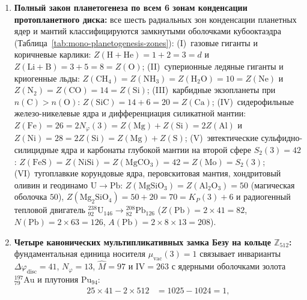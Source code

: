 \begin{theorem}[Периодическая система до 8-го периода, двухсферный перенос урана на остров стабильности $N=184$, закон планетогенеза по 6 зонам диска и четыре тождества Безу на $\mathbb{Z}_{512}$]
\begin{enumerate}[label=\textbf{(\arabic*)},leftmargin=*]
\begin{align}
    Z(\mathrm{Ti}_{22}) + Z(\mathrm{Cf}_{98}) &= Z(\mathrm{Cr}_{24}) + Z(\mathrm{Cm}_{96}) \;=\; Z(\mathrm{Fe}_{26}) + Z(\mathrm{Pu}_{94}) \;=\; 120, \label{eq:mono-hot-fusion-120} \\
    2\,N\bigl(^{238}_{92}\mathrm{U}_{146}\bigr) - 2\,\bigl(S_1(3) + S_2(3)\bigr) &= 292 - 108 \;=\; 184 \;=\; 2\,S_3(3) \;=\; N_{\mathrm{island}}(3). \label{eq:mono-uranium-transfer-184}
  \end{align}
\item \textbf{Полный закон планетогенеза по всем 6 зонам конденсации протопланетного диска:}
  все шесть радиальных зон конденсации планетных ядер и мантий классифицируются замкнутыми оболочками кубооктаэдра (Таблица~\ref{tab:mono-planetogenesis-zones}):
  (I)~газовые гиганты и коричневые карлики: $Z(\mathrm{H+He}) = 1 + 2 = 3 = d$ и $Z(\mathrm{Li+B}) = 3 + 5 = 8 = Z(\mathrm{O})$;
  (II)~суперионные ледяные гиганты и криогенные льды: $Z(\mathrm{CH_4}) = Z(\mathrm{NH_3}) = Z(\mathrm{H_2O}) = 10 = Z(\mathrm{Ne})$ и $Z(\mathrm{N_2}) = Z(\mathrm{CO}) = 14 = Z(\mathrm{Si})$;
  (III)~карбидные экзопланеты при $n(\mathrm{C}) > n(\mathrm{O})$: $Z(\mathrm{SiC}) = 14 + 6 = 20 = Z(\mathrm{Ca})$;
  (IV)~сидерофильные железо-никелевые ядра и дифференциация силикатной мантии: $Z(\mathrm{Fe}) = 26 = 2 N_\varphi(3) = Z(\mathrm{Mg}) + Z(\mathrm{Si}) = 2 Z(\mathrm{Al})$ и $Z(\mathrm{Ni}) = 28 = 2 Z(\mathrm{Si}) = Z(\mathrm{Mg}) + Z(\mathrm{S})$;
  (V)~эвтектические сульфидно-силицидные ядра и карбонаты глубокой мантии на второй сфере $S_2(3) = 42$: $Z(\mathrm{FeS}) = Z(\mathrm{NiSi}) = Z(\mathrm{MgCO_3}) = 42 = Z(\mathrm{Mo}) = S_2(3)$;
  (VI)~тугоплавкие корундовые ядра, перовскитовая мантия, хондритовый оливин и геодинамо $\mathrm{U}\to\mathrm{Pb}$: $Z(\mathrm{MgSiO_3}) = Z(\mathrm{Al_2O_3}) = 50$ (магическая оболочка $50$), $Z(\mathrm{Mg_2SiO_4}) = 50 + 20 = 70 = K_P(3) + 6$ и радиогенный тепловой двигатель $^{238}_{92}\mathrm{U}_{146} \to {}^{208}_{82}\mathrm{Pb}_{126}$ ($Z(\mathrm{Pb}) = 2\times 41 = 82$, $N(\mathrm{Pb}) = 2\times 63 = 126$, $A(\mathrm{Pb}) = 2\times 8\times 13 = 208$).
\item \textbf{Четыре канонических мультипликативных замка Безу на кольце $\mathbb{Z}_{512}$:}
  фундаментальная единица носителя $\mu_{\mathrm{vac}}(3) = 1$ связывает инварианты $\Delta\varphi_{\mathrm{disc}} = 41$, $N_\varphi = 13$, $\widehat{M} = 97$ и $\mathrm{IV} = 263$ с ядерными оболочками золота $^{197}_{79}\mathrm{Au}$ и плутония $\mathrm{Pu}_{94}$:
  \begin{align}
    25 \times 41 - 2 \times 512 &= 1025 - 1024 = 1, \label{eq:mono-four-bezout} \\

\end{align}
\end{enumerate}
\end{theorem}
